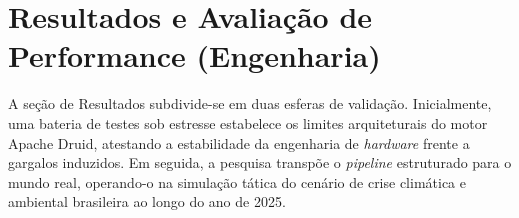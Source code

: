 \section{Resultados e Avaliação de Performance (Engenharia)}

A seção de Resultados subdivide-se em duas esferas de validação. Inicialmente, uma bateria de testes sob estresse estabelece os limites arquiteturais do motor Apache Druid, atestando a estabilidade da engenharia de \textit{hardware} frente a gargalos induzidos. Em seguida, a pesquisa transpõe o \textit{pipeline} estruturado para o mundo real, operando-o na simulação tática do cenário de crise climática e ambiental brasileira ao longo do ano de 2025.







